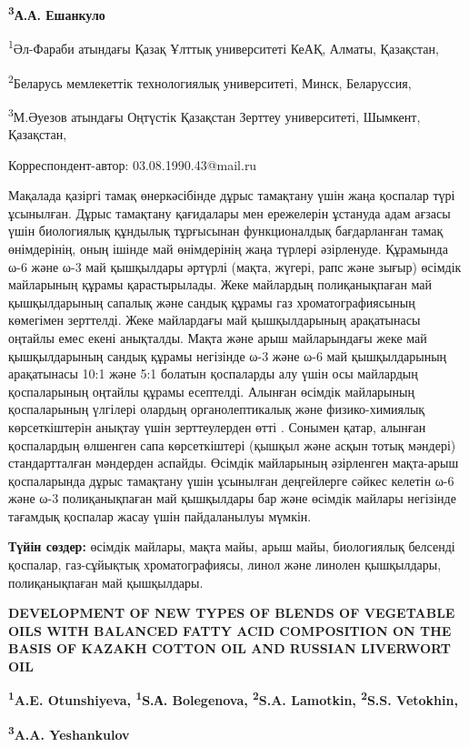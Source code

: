 {\bfseries \textsuperscript{3}А.А. Ешанкуло}

\textsuperscript{1}Әл-Фараби атындағы Қазақ Ұлттық университеті КеАҚ,
Алматы, Қазақстан,

\textsuperscript{2}Беларусь мемлекеттік технологиялық университеті,
Минск, Беларуссия,

\textsuperscript{3}М.Әуезов атындағы Оңтүстік Қазақстан Зерттеу
университеті, Шымкент, Қазақстан,

Корреспондент-автор: 03.08.1990.43@mail.ru

Мақалада қазіргі тамақ өнеркәсібінде дұрыс тамақтану үшін жаңа қоспалар
түрі ұсынылған. Дұрыс тамақтану қағидалары мен ережелерін ұстануда адам
ағзасы үшін биологиялық құндылық тұрғысынан функционалдық бағдарланған
тамақ өнімдерінің, оның ішінде май өнімдерінің жаңа түрлері әзірленуде.
Құрамында ω-6 және ω-3 май қышқылдары әртүрлі (мақта, жүгері, рапс және
зығыр) өсімдік майларының құрамы қарастырылады. Жеке майлардың
полиқанықпаған май қышқылдарының сапалық және сандық құрамы газ
хроматографиясының көмегімен зерттелді. Жеке майлардағы май
қышқылдарының арақатынасы оңтайлы емес екені анықталды. Мақта және арыш
майларындағы жеке май қышқылдарының сандық құрамы негізінде ω-3 және ω-6
май қышқылдарының арақатынасы 10:1 және 5:1 болатын қоспаларды алу үшін
осы майлардың қоспаларының оңтайлы құрамы есептелді. Алынған өсімдік
майларының қоспаларының үлгілері олардың органолептикалық және
физико-химиялық көрсеткіштерін анықтау үшін зерттеулерден өтті . Сонымен
қатар, алынған қоспалардың өлшенген сапа көрсеткіштері (қышқыл және
асқын тотық мәндері) стандартталған мәндерден аспайды. Өсімдік
майларының әзірленген мақта-арыш қоспаларында дұрыс тамақтану үшін
ұсынылған деңгейлерге сәйкес келетін ω-6 және ω-3 полиқанықпаған май
қышқылдары бар және өсімдік майлары негізінде тағамдық қоспалар жасау
үшін пайдаланылуы мүмкін.

{\bfseries Түйін сөздер:} өсімдік майлары, мақта майы, арыш майы,
биологиялық белсенді қоспалар, газ-сұйықтық хроматографиясы, линол және
линолен қышқылдары, полиқанықпаған май қышқылдары.

{\bfseries DEVELOPMENT OF NEW TYPES OF BLENDS OF VEGETABLE OILS WITH
BALANCED FATTY ACID COMPOSITION ON THE BASIS OF KAZAKH COTTON OIL AND
RUSSIAN LIVERWORT OIL}

{\bfseries \textsuperscript{1}A.E. Otunshiyeva, \textsuperscript{1}S.А.
Bolegenova, \textsuperscript{2}S.A. Lamotkin, \textsuperscript{2}S.S.
Vetokhin,}

{\bfseries \textsuperscript{3}A.A. Yeshankulov}

